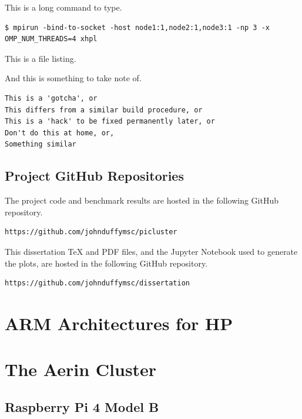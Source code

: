 \documentclass{report}
\begin{document}
This is a long command to type.

\lstset{style=type}
\begin{lstlisting}[]
$ mpirun -bind-to-socket -host node1:1,node2:1,node3:1 -np 3 -x OMP_NUM_THREADS=4 xhpl
\end{lstlisting}


This is a file listing.

\lstset{style=listingstyle}



And this is something to take note of.

\lstset{style=hack}
\begin{lstlisting}
This is a 'gotcha', or
This differs from a similar build procedure, or
This is a 'hack' to be fixed permanently later, or
Don't do this at home, or,
Something similar
\end{lstlisting}


%
%
\section{Project GitHub Repositories}

The project code and benchmark results are hosted in the following GitHub repository.

\begin{verbatim}
https://github.com/johnduffymsc/picluster
\end{verbatim}

This dissertation TeX and PDF files, and the Jupyter Notebook used to generate the plots, are hosted in the following GitHub repository.

\begin{verbatim}
https://github.com/johnduffymsc/dissertation
\end{verbatim}
 


%
%
\chapter{ARM Architectures for HP}



%
%
\chapter{The Aerin Cluster}

\section{Raspberry Pi 4 Model B}
\end{document}

